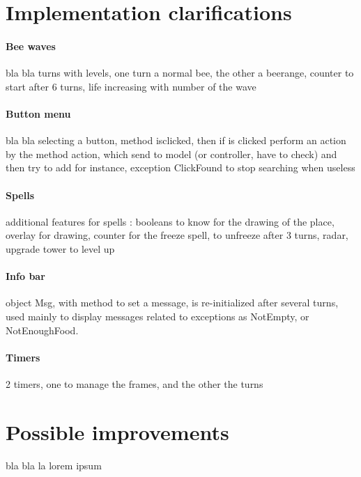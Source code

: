 \documentclass[a4paper]{article}
\begin{document}
\section{Implementation clarifications}

\paragraph{Bee waves} bla bla turns with levels, one turn a normal bee, the other a beerange, counter to start after 6 turns, life increasing with number of the wave

\paragraph{Button menu} bla bla selecting a button, method isclicked, then if is clicked perform an action by the method action, which send to model (or controller, have to check) and then try to add for instance, exception ClickFound to stop searching when useless

\paragraph{Spells} additional features for spells : booleans to know for the drawing of the place, overlay for drawing, counter for the freeze spell, to unfreeze after 3 turns, radar, upgrade tower to level up

\paragraph{Info bar} object Msg, with method to set a message, is re-initialized after several turns, used mainly to display messages related to exceptions as NotEmpty, or NotEnoughFood.

\paragraph{Timers} 2 timers, one to manage the frames, and the other the turns




\section{Possible improvements}
bla bla la lorem ipsum

\end{document}
